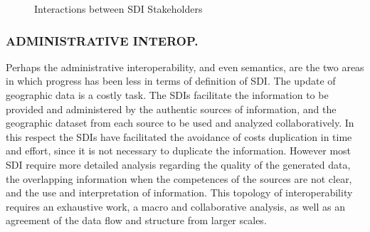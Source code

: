 \documentclass[10pt,twocolumn,ieeetran]{article}
\begin{document}
\begin{figure}[h]
\begin{center}
\caption{Interactions between SDI Stakeholders}
\label{fig5}
\end{center}
\end{figure}


\subsubsection{ADMINISTRATIVE INTEROP.}
Perhaps the administrative interoperability, and even semantics, are the two areas in which progress has been less in terms of definition of SDI. The update of geographic data is a costly task. The SDIs facilitate the information to be provided and administered by the authentic sources of information, and  the geographic dataset from each source to be used and analyzed collaboratively. In this respect  the SDIs have facilitated the avoidance of costs  duplication  in time and effort, since it is not necessary  to duplicate  the information.
However most SDI require more detailed analysis regarding the quality of the generated data, the overlapping  information when the competences of the sources are not clear, and the use and interpretation of information. This topology of interoperability requires an exhaustive work,  a macro and collaborative analysis, as well as an agreement of the data flow and structure from larger scales.
\end{document}
